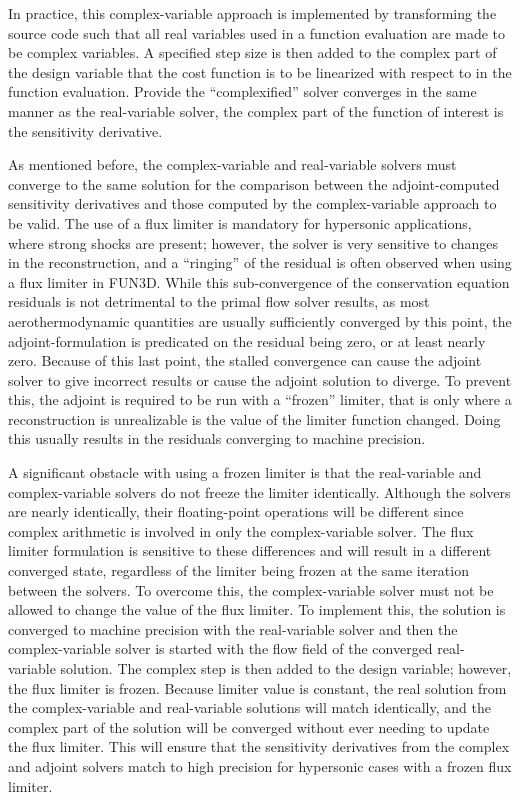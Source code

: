 In practice, this complex-variable approach is implemented by transforming the
source code such that all real variables used in a function evaluation are made
to be complex variables.  A specified step size is then added to the complex
part of the design variable that the cost function is to be linearized with
respect to in the function evaluation.  Provide the ``complexified'' solver
converges in the same manner as the real-variable solver, the complex part of
the function of interest is the sensitivity derivative.

As mentioned before, the complex-variable and real-variable solvers must
converge to the same solution for the comparison between the adjoint-computed
sensitivity derivatives and those computed by the complex-variable approach to
be valid.  The use of a flux limiter is mandatory for hypersonic applications,
where strong shocks are present; however, the solver is very sensitive to
changes in the reconstruction, and a ``ringing'' of the residual is often
observed\cite{gnoffo2007ringing} when using a flux limiter in FUN3D. While this
sub-convergence of the conservation equation residuals is not detrimental to the
primal flow solver results, as most aerothermodynamic quantities are usually
sufficiently converged by this point, the adjoint-formulation is predicated on
the residual being zero, or at least nearly zero.  Because of this last point,
the stalled convergence can cause the adjoint solver to give incorrect results
or cause the adjoint solution to diverge.  To prevent this, the adjoint is
required to be run with a ``frozen'' limiter, that is only where a
reconstruction is unrealizable is the value of the limiter function changed.
 Doing this usually results in the residuals converging to machine precision.

A significant obstacle with using a frozen limiter is that the real-variable and
complex-variable solvers do not freeze the limiter identically.  Although the
solvers are nearly identically, their floating-point operations will be
different since complex arithmetic is involved in only the complex-variable
solver.  The flux limiter formulation is sensitive to these differences and will
result in a different converged state, regardless of the limiter being frozen
at the same iteration between the solvers.  To overcome this, the
complex-variable solver must not be allowed to change the value of the flux
limiter.  To implement this, the solution is converged to machine precision with
the real-variable solver and then the complex-variable solver is started with
the flow field of the converged real-variable solution.  The complex step is
then added to the design variable; however, the flux limiter is frozen.  Because
limiter value is constant, the real solution from the complex-variable and
real-variable solutions will match identically, and the complex part of the
solution will be converged without ever needing to update the flux limiter.
This will ensure that the sensitivity derivatives from the complex and adjoint
solvers match to high precision for hypersonic cases with a frozen flux limiter.

